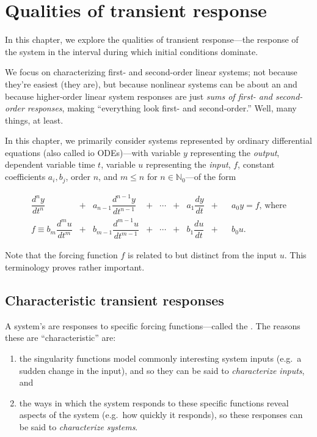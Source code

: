 \documentclass[dynamic_systems.tex]{subfiles}
\begin{document}
\chapter[Transient response]{Qualities of transient response}
\tags{}

In this chapter, we explore the qualities of transient response---the response of the system in the interval during which initial conditions dominate.
\tags{}

We focus on characterizing first- and second-order linear systems; not because they're easiest (they are), but because nonlinear systems can be  about an  and because higher-order linear system responses are just \emph{sums of first- and second-order responses}, making ``everything look first- and second-order.''
Well, many things, at least.
\tags{}

In this chapter, we primarily consider systems represented by  ordinary differential equations (also called io ODEs)---with variable $y$ representing the \emph{output}, dependent variable time $t$, variable $u$ representing the \emph{input},  $f$, constant coefficients $a_i,b_j$, order $n$, and $m \le n$ for $n\in\mathbb{N}_0$---of the form
\tags{}

\begin{subequations}
\begin{alignat}{8}
\label{eq:ioode1}
	\dfrac{d^n y}{d t^n} & {}+{} & 
	a_{n-1} \dfrac{d^{n-1} y}{d t^{n-1}} & {}+{} & 
	\cdots  & {}+{} &
	a_1 \dfrac{d y}{d t}  & {}+{} && 
	a_0 y = f \text{, where} \\
	f \equiv b_m \dfrac{d^m u}{d t^m}  & {}+{} & 
	b_{m-1} \dfrac{d^{m-1} u}{d t^{m-1}}  & {}+{} & 
	\cdots & {}+{} & 
	b_1 \dfrac{d u}{d t} & {}+{} &&
	b_0 u. \label{eq:ioode2}
\end{alignat}
\end{subequations}

Note that the forcing function $f$ is related to but distinct from the input $u$.
This terminology proves rather important.
\tags{}

\section{Characteristic transient responses}
\tags{}

A system's  are responses to specific forcing functions---called the .
The reasons these are ``characteristic'' are:
\tags{}
\begin{enumerate}
	\item the singularity functions model commonly interesting system inputs (e.g.\ a sudden change in the input), and so they can be said to \emph{characterize inputs}, and
	\item the ways in which the system responds to these specific functions reveal aspects of the system (e.g.\ how quickly it responds), so these responses can be said to \emph{characterize systems}.
\end{enumerate}
\end{document}
